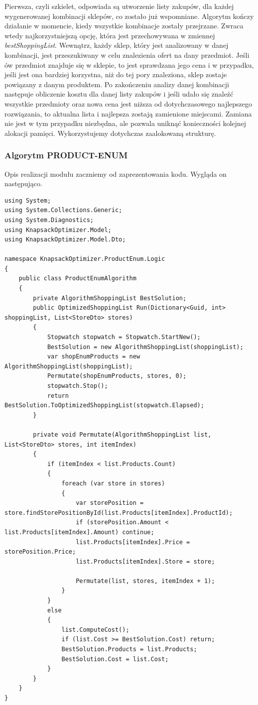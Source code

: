 \documentclass[a4paper]{article}
\begin{document}
Pierwsza, czyli szkielet, odpowiada są utworzenie listy zakupów, dla każdej wygenerowanej kombinacji sklepów, co zostało już wspomniane. Algorytm kończy działanie w momencie, kiedy wszystkie kombinacje zostały przejrzane. Zwraca wtedy najkorzystniejszą opcję, która jest przechowywana w zmiennej \textit{bestShoppingList}. Wewnątrz, każdy sklep, który jest analizowany w danej kombinacji, jest przeszukiwany w celu znalezienia ofert na dany przedmiot. Jeśli ów przedmiot znajduje się w sklepie, to jest sprawdzana jego cena i w przypadku, jeśli jest ona bardziej korzystna, niż do tej pory znaleziona, sklep zostaje powiązany z danym produktem. Po zakończeniu analizy danej kombinacji następuje obliczenie kosztu dla danej listy zakupów i jeśli udało się znaleźć wszystkie przedmioty oraz nowa cena jest niższa od dotychczasowego najlepszego rozwiązania, to aktualna lista i najlepsza zostają zamienione miejscami. Zamiana nie jest w tym przypadku niezbędna, ale pozwala uniknąć konieczności kolejnej alokacji pamięci. Wykorzystujemy dotychczas zaalokowaną strukturę.

\subsubsection{Algorytm PRODUCT-ENUM}
Opis realizacji modułu zaczniemy od zaprezentowania kodu. Wygląda on następująco.
\begin{lstlisting}
using System;
using System.Collections.Generic;
using System.Diagnostics;
using KnapsackOptimizer.Model;
using KnapsackOptimizer.Model.Dto;

namespace KnapsackOptimizer.ProductEnum.Logic
{
	public class ProductEnumAlgorithm
	{
		private AlgorithmShoppingList BestSolution;
		public OptimizedShoppingList Run(Dictionary<Guid, int> shoppingList, List<StoreDto> stores)
		{
			Stopwatch stopwatch = Stopwatch.StartNew();
			BestSolution = new AlgorithmShoppingList(shoppingList);    
			var shopEnumProducts = new AlgorithmShoppingList(shoppingList);
			Permutate(shopEnumProducts, stores, 0);
			stopwatch.Stop();
			return BestSolution.ToOptimizedShoppingList(stopwatch.Elapsed);
		}

		private void Permutate(AlgorithmShoppingList list, List<StoreDto> stores, int itemIndex)
		{
			if (itemIndex < list.Products.Count)
			{
				foreach (var store in stores)
				{
					var storePosition = store.findStorePositionById(list.Products[itemIndex].ProductId);
					if (storePosition.Amount < list.Products[itemIndex].Amount) continue;
					list.Products[itemIndex].Price = storePosition.Price;
					list.Products[itemIndex].Store = store;

					Permutate(list, stores, itemIndex + 1);
				}
			}
			else
			{
				list.ComputeCost();
				if (list.Cost >= BestSolution.Cost) return;
				BestSolution.Products = list.Products;
				BestSolution.Cost = list.Cost;
			}
		}
	}
}

\end{lstlisting}
\end{document}

